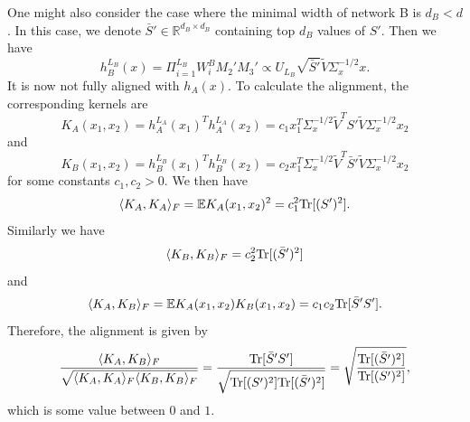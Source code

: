 \documentclass{article}
\theoremstyle{plain}
\newcommand{\Tr}{{\rm Tr}}
\begin{document}
One might also consider the case where the minimal width of network B is $d_B<d$. In this case, we denote $\bar{S}'\in\mathbb{R}^{d_B\times d_B}$ containing top $d_B$ values of $S'$. Then we have
\begin{equation}
h_B^{L_B}(x)=\Pi_{i=1}^{L_B}W_i^BM_2'M_3'\propto U_{L_B}\sqrt{\bar{S}'}\tilde{V}\Sigma_x^{-1/2}x.
\end{equation}
It is now not fully aligned with $h_A(x)$. To calculate the alignment, the corresponding kernels are
\begin{equation}
K_A(x_1,x_2)=h_A^{L_A}(x_1)^Th_A^{L_A}(x_2)=c_1x_1^T\Sigma_x^{-1/2}\tilde{V}^TS'\tilde{V}\Sigma_x^{-1/2}x_2
\end{equation}
and
\begin{equation}
K_B(x_1,x_2)=h_B^{L_B}(x_1)^Th_B^{L_B}(x_2)=c_2 x_1^T\Sigma_x^{-1/2}\tilde{V}^T\bar{S}'\tilde{V}\Sigma_x^{-1/2}x_2
\end{equation}
for some constants $c_1,c_2>0$. We then have
\begin{equation}
\langle K_A,K_A\rangle_F=\mathbb{E}K_A(x_1,x_2)^2=c_1^2\Tr[(S')^2].
\end{equation}
Similarly we have
\begin{equation}
\langle K_B,K_B\rangle_F=c_2^2\Tr[(\bar{S}')^2]
\end{equation}
and
\begin{equation}
\langle K_A,K_B\rangle_F=\mathbb{E}K_A(x_1,x_2)K_B(x_1,x_2)=c_1c_2\Tr[\bar{S}'S'].
\end{equation}
Therefore, the alignment is given by
\begin{equation}
\frac{\langle K_A,K_B\rangle_F}{\sqrt{\langle K_A,K_A\rangle_F\langle K_B,K_B\rangle_F}}=\frac{\Tr[\bar{S}'S']}{\sqrt{\Tr[(S')^2]\Tr[(\bar{S}')^2]}}=\sqrt{\frac{\Tr[(\bar{S}')^2]}{\Tr[(S')^2]}},
\end{equation}
which is some value between $0$ and $1$.
\end{document}
